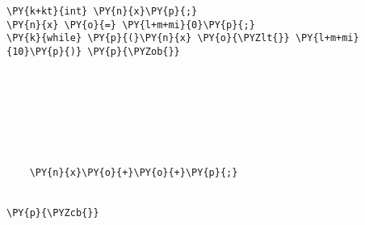 \begin{Verbatim}[commandchars=\\\{\}]
\PY{k+kt}{int} \PY{n}{x}\PY{p}{;}
\PY{n}{x} \PY{o}{=} \PY{l+m+mi}{0}\PY{p}{;}
\PY{k}{while} \PY{p}{(}\PY{n}{x} \PY{o}{\PYZlt{}} \PY{l+m+mi}{10}\PY{p}{)} \PY{p}{\PYZob{}}








    \PY{n}{x}\PY{o}{+}\PY{o}{+}\PY{p}{;}


\PY{p}{\PYZcb{}}
\end{Verbatim}
